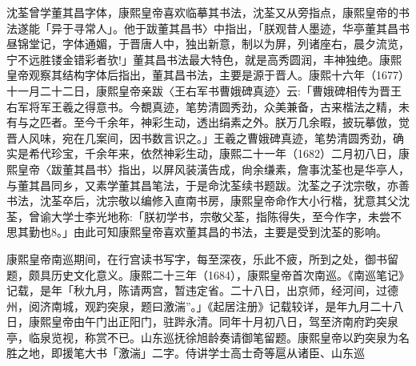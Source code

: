 \vfill
\begin{BookNotes}
\end{BookNotes}


沈荃曾学董其昌字体，康熙皇帝喜欢临摹其书法，沈荃又从旁指点，康熙皇帝的书法遂能「异于寻常人」。他于跋董其昌书〉中指出，「朕观昔人墨迹，华亭董其昌书昼锦堂记，字体通媚，于晋唐人中，独出新意，制以为屏，列诸座右，晨夕流览，宁不远胜镂金错彩者欤!」董其昌书法最大特色，就是高秀圆润，丰神独绝。康熙皇帝观察其结构字体后指出，董其昌书法，主要是源于晋人。康熙十六年（1677）十一月二十二日，康熙皇帝亲跋〈王右军书曹娥碑真迹〉云:「曹娥碑相传为晋王右军将军王羲之得意书。今覩真迹，笔势清圆秀劲，众美兼备，古来楷法之精，未有与之匹者。至今千余年，神彩生动，透出绢素之外。朕万几余暇，披玩摹倣，觉晋人风味，宛在几案间，因书数言识之。」王羲之曹娥碑真迹，笔势清圆秀劲，确实是希代珍宝，千余年来，依然神彩生动，康熙二十一年（1682）二月初八日，康熙皇帝〈跋董其昌书〉指出，以屏风装潢告成，尙余缣素，詹事沈荃也是华亭人，与董其昌同乡，又素学董其昌笔法，于是命沈荃续书题跋。沈荃之子沈宗敬，亦善书法，沈荃卒后，沈宗敬以编修入直南书房，康熙皇帝命作大小行楷，犹意其父沈荃，曾谕大学士李光地称:「朕初学书，宗敬父荃，指陈得失，至今作字，未尝不思其勤也8。」由此可知康熙皇帝喜欢董其昌的书法，主要是受到沈荃的影响。

康熙皇帝南巡期间，在行宫读书写字，每至深夜，乐此不疲，所到之处，御书留题，颇具历史文化意义。康熙二十三年（1684），康熙皇帝首次南巡。《南巡笔记》记载，是年「秋九月，陈请两宫，暂违定省。二十八日，出京师，经河间，过德州，阅济南城，观趵突泉，题曰激湍”。」《起居注册》记载较详，是年九月二十八日，康熙皇帝由午门出正阳门，驻跸永清。同年十月初八日，驾至济南府趵突泉亭，临泉览视，称赏不已。山东巡抚徐旭龄奏请御笔留题。康熙皇帝以趵突泉为名胜之地，即援笔大书「激湍」二字。侍讲学士高士奇等扈从诸臣、山东巡

\vfill
\begin{BookNotes}
\end{BookNotes}

